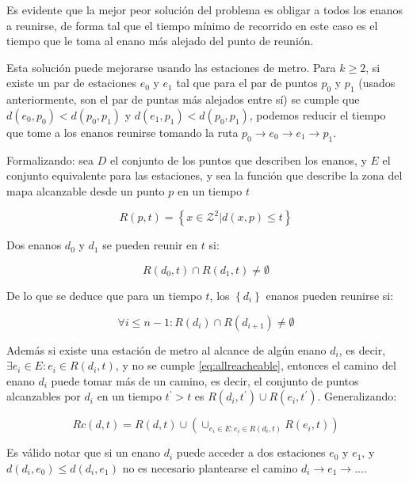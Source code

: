 Es evidente que la mejor peor solución del problema es obligar a todos los enanos a reunirse, de forma tal que el tiempo mínimo de recorrido en este caso es el tiempo que le toma al enano más alejado del punto de reunión.

Esta solución puede mejorarse usando las estaciones de metro. Para \(k\geq2\), si existe un par de estaciones \(e_0\) y \(e_1\) tal que para el par de puntos \(p_0\) y \(p_1\) (usados anteriormente, son el par de puntas más alejados entre sí) se cumple que \(d(e_0,p_0)<d(p_0,p_1)\) y \(d(e_1,p_1)<d(p_0,p_1)\), podemos reducir el tiempo que tome a los enanos reunirse tomando la ruta \(p_0\rightarrow e_0\rightarrow e_1\rightarrow p_1\).

Formalizando: sea \(D\) el conjunto de los puntos que describen los enanos, y \(E\) el conjunto equivalente para las estaciones, y sea la función que describe la zona del mapa alcanzable desde un punto \(p\) en un tiempo \(t\)

\begin{equation}
  R(p,t)=\left\{x\in\mathcal{Z}^2|d(x,p)\leq t\right\}
  \label{eq:reacheable}
\end{equation}

Dos enanos \(d_0\) y \(d_1\) se pueden reunir en \(t\) si:

\begin{equation*}
  R(d_0,t)\cap R(d_1,t)\neq\emptyset
\end{equation*}

De lo que se deduce que para un tiempo \(t\), los \(\left\{d_i\right\}\) enanos pueden reunirse si:

\begin{equation}
  \forall i\leq n-1: R(d_i)\cap R(d_{i+1})\neq\emptyset
  \label{eq:allreacheable}
\end{equation}

Además si existe una estación de metro al alcance de algún enano \(d_i\), es decir, \(\exists e_i\in E: e_i\in R(d_i,t)\), y no se cumple \eqref{eq:allreacheable}, entonces el camino del enano \(d_i\) puede tomar más de un camino, es decir, el conjunto de puntos alcanzables por \(d_i\) en un tiempo \(t^{\prime}>t\) es \(R(d_i,t^{\prime})\cup R(e_i,t^{\prime})\). Generalizando:

\begin{equation}
  Rc(d,t)=R(d,t)\cup (\cup_{e_i\in E: e_i\in R(d_i,t)}{R(e_i,t)})
  \label{eq:reacheableclosure}
\end{equation}

Es válido notar que si un enano \(d_i\) puede acceder a dos estaciones \(e_0\) y \(e_1\), y \(d(d_i,e_0)\leq d(d_i,e_1)\) no es necesario plantearse el camino \(d_i\rightarrow e_1\rightarrow ...\).

